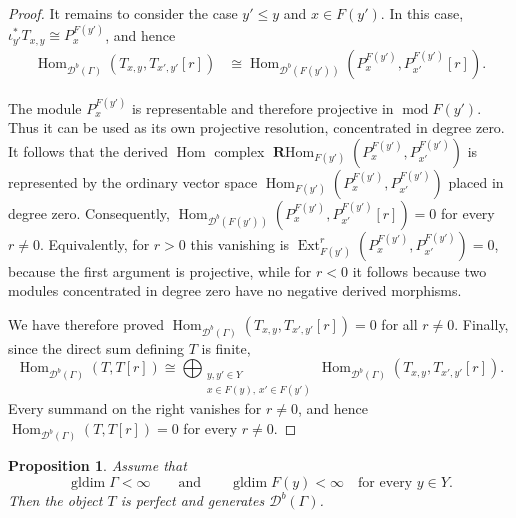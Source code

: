 \documentclass[12pt,a4paper,english,reqno]{amsart}
\theoremstyle{plain}
\newtheorem{proposition}[theorem]{Proposition}
\theoremstyle{definition}
\newcommand{\Hom}{\operatorname{Hom}}
\newcommand{\RHom}{\operatorname{\mathbf{R}Hom}}
\newcommand{\gldim}{\operatorname{gldim}}
\newcommand{\G}{\Gamma}
\newcommand{\modu}{\operatorname{mod}}
\newcommand{\Ext}{\operatorname{Ext}}
\newcommand{\Db}[1]{{\mathscr D}^b(#1)}
\begin{document}
\begin{proof}
It remains to consider the case $y'\leq y$ and $x\in F(y')$.
In this case, $\iota_{y'}^*T_{x,y}\cong P_x^{F(y')}$,
and hence
\begin{align*}
\Hom_{\Db{\G}}(T_{x,y},T_{x',y'}[r])
&\cong
\Hom_{\Db{F(y')}}(P_x^{F(y')},P_{x'}^{F(y')}[r]).
\end{align*}

The module $P_x^{F(y')}$ is representable and therefore projective in
$\modu F(y')$. Thus it can be used as its own projective resolution,
concentrated in degree zero. It follows that the derived $\Hom$ complex
$\RHom_{F(y')}(P_x^{F(y')},P_{x'}^{F(y')})$
is represented by the ordinary vector space $\Hom_{F(y')}(P_x^{F(y')},P_{x'}^{F(y')})$
placed in degree zero. Consequently,
$\Hom_{\Db{F(y')}}(P_x^{F(y')},P_{x'}^{F(y')}[r])=0$ for every $r\neq0.$
Equivalently, for $r>0$ this vanishing is $\Ext_{F(y')}^r(P_x^{F(y')},P_{x'}^{F(y')})=0$,
because the first argument is projective, while for $r<0$ it follows
because two modules concentrated in degree zero have no negative
derived morphisms.

We have therefore proved $\Hom_{\Db{\G}}(T_{x,y},T_{x',y'}[r])=0$ for all $r\neq0$.
Finally, since the direct sum defining $T$ is finite,
\[
\Hom_{\Db{\G}}(T,T[r])
\cong
\bigoplus_{\substack{y,y'\in Y\\
x\in F(y),\,x'\in F(y')}}
\Hom_{\Db{\G}}(T_{x,y},T_{x',y'}[r]).
\]
Every summand on the right vanishes for $r\neq0$, and hence
$\Hom_{\Db{\G}}(T,T[r])=0$ for every $r\neq0$.
\end{proof}

\begin{proposition}
\label{prop:T-generates}
Assume that
\[
 \gldim\G<\infty
 \qquad\text{and}\qquad
 \gldim F(y)<\infty\quad\text{for every }y\in Y.
\]
Then the object $T$ is perfect and generates $\Db{\G}$.
\end{proposition}
\end{document}
